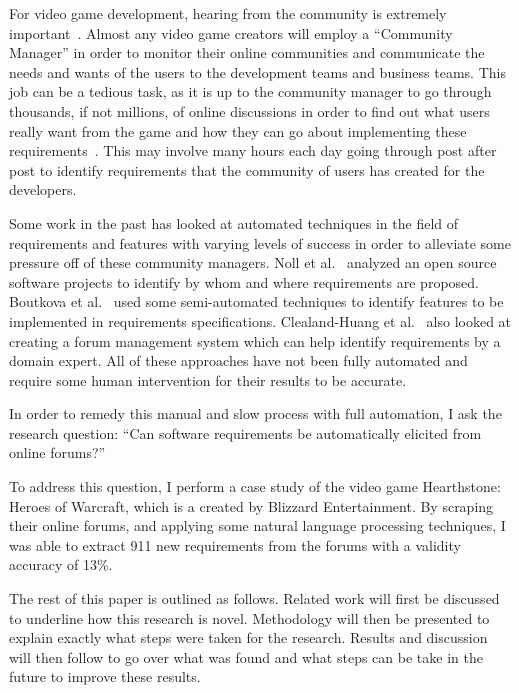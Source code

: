 \documentclass[conference]{IEEEtran}
\begin{document}
For video game development, hearing from the community is extremely important~\cite{Ruggles:2005:OCB}. Almost any
video game creators will employ a ``Community Manager'' in order to monitor their online
communities and communicate the needs and wants of the users to the development teams and
business teams. This job can be a tedious task, as it is up to the community manager to
go through thousands, if not millions, of online discussions in order to find out what
users really want from the game and how they can go about implementing these
requirements~\cite{Gottipati:2011:FRA}.
This may involve many hours each day going through post after post to identify requirements
that the community of users has created for the developers.

Some work in the past has looked at automated techniques in the field of requirements and
features with varying levels of success in order to alleviate some
pressure off of these community managers. Noll et al.~\cite{Noll:2010:REO}
analyzed an open source software projects to
identify by whom and where requirements are proposed. Boutkova et al.~\cite{Boutkova}
used some semi-automated
techniques to identify features to be implemented in requirements specifications. Clealand-Huang
et al.~\cite{Cleland-HuangDDC09} also looked at creating a forum management system which can help identify requirements
by a domain expert. All of these approaches have not been fully automated and require some
human intervention for their results to be accurate.

In order to remedy this manual and slow process with full automation, I ask the research question:
``Can software requirements be automatically elicited from online forums?''

To address this question, I perform a case study of the video game Hearthstone: Heroes of Warcraft,
which is a created by Blizzard Entertainment. By scraping their online forums, and applying some
natural language processing techniques, I was able to extract 911 new requirements from the forums
with a validity accuracy of 13\%.

The rest of this paper is outlined as follows. Related work will first be discussed to underline
how this research is novel. Methodology will then be presented to explain exactly what steps were taken
for the research. Results and discussion will then follow to go over what was found and what steps
can be take in the future to improve these results.
\end{document}
